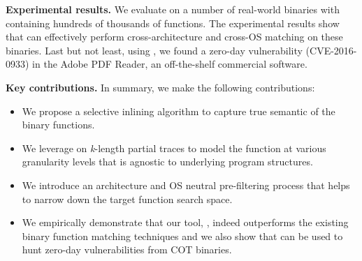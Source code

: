 \noindent\textbf{Experimental results.} We evaluate \tool on a number of real-world binaries with containing hundreds of thousands of functions.
The experimental results show that \tool can effectively perform cross-architecture and cross-OS matching on these binaries.  
Last but not least, using \tool, we found a zero-day vulnerability (CVE-2016-0933) in the Adobe PDF Reader, an off-the-shelf commercial software.

\noindent\textbf{Key contributions.} In summary, we make the following contributions:
\begin{itemize}[nolistsep]
\itemsep0em
\item We propose a selective inlining algorithm to capture true semantic of the binary functions.
\item We leverage on \emph{k}-length partial traces to model the function at various granularity levels that is agnostic to underlying program structures.
\item We introduce an architecture and OS neutral pre-filtering process that helps to narrow down the target function search space.
\item We empirically demonstrate that our tool, \tool, indeed outperforms the existing binary function matching techniques and we also show that \tool can be used to hunt zero-day vulnerabilities from COT binaries.
\end{itemize}

